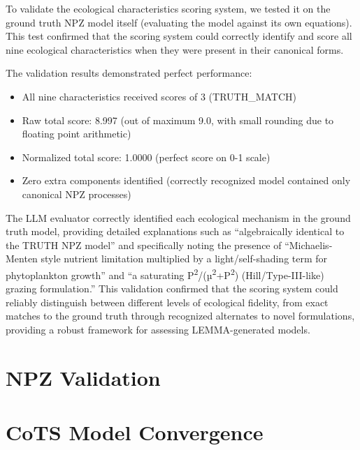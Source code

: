 To validate the ecological characteristics scoring system, we tested it on the ground truth NPZ model itself (evaluating the model against its own equations). This test confirmed that the scoring system could correctly identify and score all nine ecological characteristics when they were present in their canonical forms.

The validation results demonstrated perfect performance:

\begin{itemize}
    \item All nine characteristics received scores of 3 (TRUTH\_MATCH)
    \item Raw total score: 8.997 (out of maximum 9.0, with small rounding due to floating point arithmetic)
    \item Normalized total score: 1.0000 (perfect score on 0-1 scale)
    \item Zero extra components identified (correctly recognized model contained only canonical NPZ processes)
\end{itemize}

The LLM evaluator correctly identified each ecological mechanism in the ground truth model, providing detailed explanations such as ``algebraically identical to the TRUTH NPZ model'' and specifically noting the presence of ``Michaelis-Menten style nutrient limitation multiplied by a light/self-shading term for phytoplankton growth'' and ``a saturating P\textsuperscript{2}/(µ\textsuperscript{2}+P\textsuperscript{2}) (Hill/Type-III-like) grazing formulation.'' This validation confirmed that the scoring system could reliably distinguish between different levels of ecological fidelity, from exact matches to the ground truth through recognized alternates to novel formulations, providing a robust framework for assessing LEMMA-generated models.

\section{NPZ Validation}
\label{sec:npz_validation}



\section{CoTS Model Convergence}
\label{sec:convergence}
    
